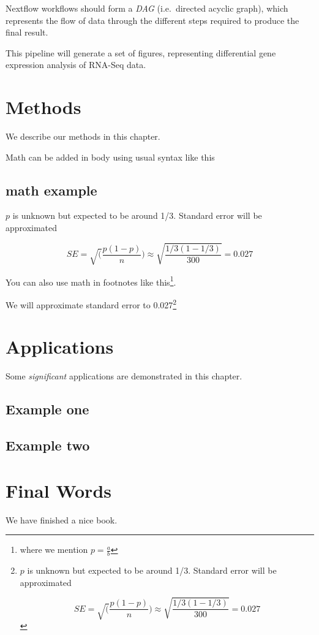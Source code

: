 \documentclass[
  openany]{book}
\begin{document}
Nextflow workflows should form a \emph{DAG} (i.e.~directed acyclic graph), which represents the flow of data through the different steps
required to produce the final result.

This pipeline will generate a set of figures, representing differential gene expression analysis of RNA-Seq data.

\hypertarget{methods}{%
\chapter{Methods}\label{methods}}

We describe our methods in this chapter.

Math can be added in body using usual syntax like this

\hypertarget{math-example}{%
\section{math example}\label{math-example}}

\(p\) is unknown but expected to be around 1/3. Standard error will be approximated

\[
SE = \sqrt(\frac{p(1-p)}{n}) \approx \sqrt{\frac{1/3 (1 - 1/3)} {300}} = 0.027
\]

You can also use math in footnotes like this\footnote{where we mention \(p = \frac{a}{b}\)}.

We will approximate standard error to 0.027\footnote{\(p\) is unknown but expected to be around 1/3. Standard error will be approximated

  \[
  SE = \sqrt(\frac{p(1-p)}{n}) \approx \sqrt{\frac{1/3 (1 - 1/3)} {300}} = 0.027
  \]}

\hypertarget{applications}{%
\chapter{Applications}\label{applications}}

Some \emph{significant} applications are demonstrated in this chapter.

\hypertarget{example-one}{%
\section{Example one}\label{example-one}}

\hypertarget{example-two}{%
\section{Example two}\label{example-two}}

\hypertarget{final-words}{%
\chapter{Final Words}\label{final-words}}

We have finished a nice book.

  
\end{document}
